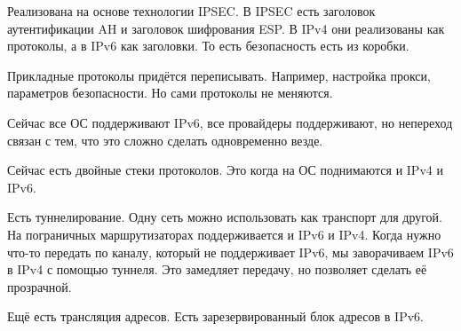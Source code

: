 
Реализована на основе технологии IPSEC. В IPSEC есть заголовок аутентификации AH и заголовок шифрования ESP. В IPv4 они реализованы как протоколы, а в IPv6 как заголовки. То есть безопасность есть из коробки.


Прикладные протоколы придётся переписывать. Например, настройка прокси, параметров безопасности. Но сами протоколы не меняются.

Сейчас все ОС поддерживают IPv6, все провайдеры поддерживают, но непереход связан с тем, что это сложно сделать одновременно везде.

Сейчас есть двойные стеки протоколов. Это когда на ОС поднимаются и IPv4 и IPv6.

Есть туннелирование. Одну сеть можно использовать как транспорт для другой. На пограничных маршрутизаторах поддерживается и IPv6 и IPv4. Когда нужно что-то передать по каналу, который не поддерживает IPv6, мы заворачиваем IPv6 в IPv4 с помощью туннеля. Это замедляет передачу, но позволяет сделать её прозрачной.

Ещё есть трансляция адресов. Есть зарезервированный блок адресов в IPv6.
